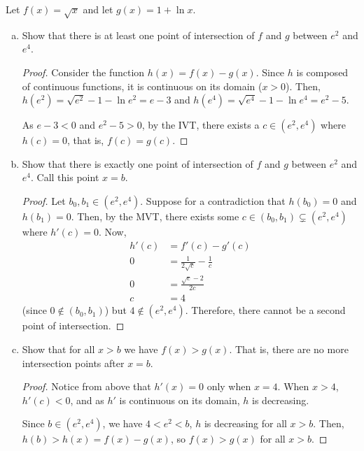 \question Let $f(x) = \sqrt{x}$ and let $g(x) = 1 + \ln x$.
\begin{enumerate}[(a)]
  \item Show that there is at least one point of intersection of $f$ and $g$ between $e^2$ and $e^4$.
        \begin{proof}
          Consider the function $h(x) = f(x) - g(x)$.
          Since $h$ is composed of continuous functions, it is continuous on its domain ($x > 0$).
          Then, $h(e^2) = \sqrt{e^2} - 1 - \ln e^2 = e-3$ and $h(e^4) = \sqrt{e^4} - 1 - \ln e^4 = e^2-5$.

          As $e-3 < 0$ and $e^2-5 > 0$, by the IVT, there exists a $c\in(e^2,e^4)$ where $h(c)=0$,
          that is, $f(c) = g(c)$.
        \end{proof}
  \item Show that there is exactly one point of intersection of $f$ and $g$ between $e^2$ and $e^4$.
        Call this point $x=b$.
        \begin{proof}
          Let $b_0,b_1\in(e^2,e^4)$.
          Suppose for a contradiction that $h(b_0) = 0$ and $h(b_1) = 0$.
          Then, by the MVT, there exists some $c\in(b_0,b_1)\subsetneq(e^2,e^4)$ where $h'(c) = 0$.
          Now,
          \begin{align*}
            h'(c) & = f'(c) - g'(c)                     \\
            0     & = \frac{1}{2\sqrt{c}} - \frac{1}{c} \\
            0     & = \frac{\sqrt{c} - 2}{2c}           \\
            c     & = 4
          \end{align*}
          (since $0 \not\in(b_0,b_1)$) but $4 \not\in (e^2,e^4)$.
          Therefore, there cannot be a second point of intersection.
        \end{proof}
  \item Show that for all $x > b$ we have $f(x) > g(x)$.
        That is, there are no more intersection points after $x=b$.
        \begin{proof}
          Notice from above that $h'(x) = 0$ only when $x=4$.
          When $x > 4$, $h'(c) < 0$, and as $h'$ is continuous on its domain, $h$ is decreasing.

          Since $b \in (e^2,e^4)$, we have $4 < e^2 < b$, $h$ is decreasing for all $x>b$.
          Then, $h(b) > h(x) = f(x)-g(x)$, so $f(x) > g(x)$ for all $x > b$.
        \end{proof}
\end{enumerate}


